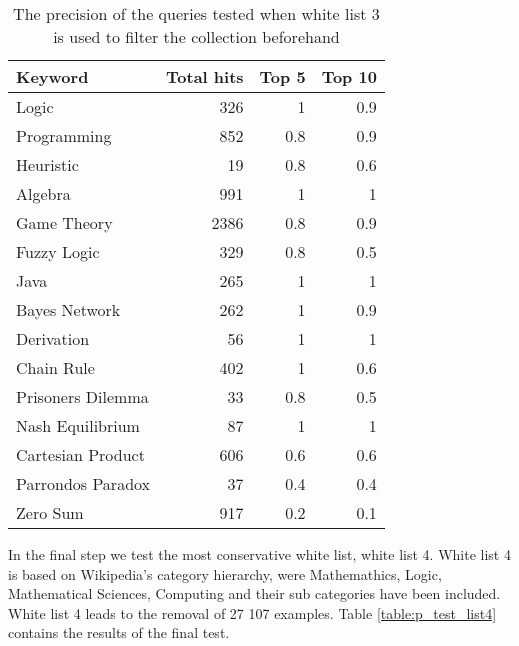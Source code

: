 \begin{table}[H]
\centering
\begin{tabular} {|| p{15em} | r | r | r ||} 
 \hline
 Keyword & Total hits & Top 5 & Top 10 \\ [0.5ex] 
 \hline

Logic & 326 & 1 & 0.9 \\
Programming & 852 & 0.8 & 0.9 \\
Heuristic & 19 & 0.8 & 0.6 \\
Algebra & 991 & 1 & 1 \\
Game Theory & 2386 & 0.8 & 0.9 \\
\hline
Fuzzy Logic & 329 & 0.8 & 0.5 \\
Java & 265 & 1 & 1 \\
Bayes Network & 262 & 1 & 0.9 \\
Derivation & 56 & 1 & 1 \\
\hline
Chain Rule & 402 & 1 & 0.6 \\
Prisoners Dilemma & 33 & 0.8 & 0.5 \\
Nash Equilibrium & 87 & 1 & 1 \\
Cartesian Product & 606 & 0.6 & 0.6 \\
Parrondos Paradox & 37 & 0.4 & 0.4 \\
Zero Sum & 917 & 0.2 & 0.1 \\

 \hline
\end{tabular}
\caption{The precision of the queries tested when white list 3 is used to filter the collection beforehand}
\label{table:p_test_list3}
\end{table}

In the final step we test the most conservative white list, white list 4. White list 4 is based on Wikipedia's category hierarchy, were Mathemathics, Logic, Mathematical Sciences, Computing and their sub categories have been included. White list 4 leads to the removal of 27 107 examples. Table \ref{table:p_test_list4} contains the results of the final test. 

